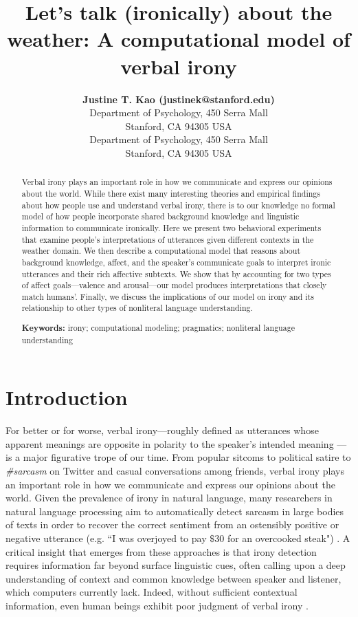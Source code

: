 \documentclass[10pt,letterpaper]{article}
\title{Let's talk (ironically) about the weather: A computational model of verbal irony}
\author{{\large \bf Justine T. Kao
(justinek@stanford.edu)} \\
  Department of Psychology, 450 Serra Mall \\
  Stanford, CA 94305 USA
  \AND {\large \bf Noah D. Goodman (ngoodman@stanford.edu)} \\
  Department of Psychology, 450 Serra Mall \\
  Stanford, CA 94305 USA}
\begin{document}
\maketitle


\begin{abstract}
Verbal irony plays an important role in how we communicate and express our opinions about the world. While there exist many interesting theories and empirical findings about how people use and understand verbal irony, there is to our knowledge no formal model of how people incorporate shared background knowledge and linguistic information to communicate ironically. Here we present two behavioral experiments that examine people's interpretations of utterances given different contexts in the weather domain. We then describe a computational model that reasons about background knowledge, affect, and the speaker's communicate goals to interpret ironic utterances and their rich affective subtexts. We show that by accounting for two types of affect goals---valence and arousal---our model produces interpretations that closely match humans'. Finally, we discuss the implications of our model on irony and its relationship to other types of nonliteral language understanding.


\textbf{Keywords:} 
irony; computational modeling; pragmatics; nonliteral language understanding
\end{abstract}


\section{Introduction}
For better or for worse, verbal irony---roughly defined as utterances whose apparent meanings are opposite in polarity to the speaker's intended meaning \cite{roberts1994people, colston2000contrast}---is a major figurative trope of our time. From popular sitcoms to political satire to \emph{\#sarcasm} on Twitter and casual conversations among friends, verbal irony plays an important role in how we communicate and express our opinions about the world. Given the prevalence of irony in natural language, many researchers in natural language processing aim to automatically detect sarcasm in large bodies of texts in order to recover the correct sentiment from an ostensibly positive or negative utterance (e.g. ``I was overjoyed to pay $\$30$ for an overcooked steak") \cite{davidov2010semi, filatova2012irony}. A critical insight that emerges from these approaches is that irony detection requires information far beyond surface linguistic cues, often calling upon a deep understanding of context and common knowledge between speaker and listener, which computers currently lack. Indeed, without sufficient contextual information, even human beings exhibit poor judgment of verbal irony \cite{gonzalez2011identifying, wallacehumans}. 
\end{document}
